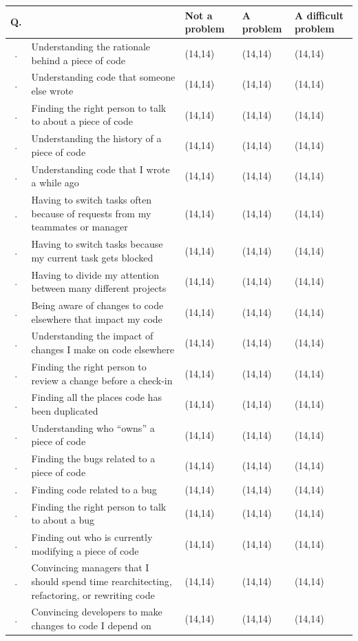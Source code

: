 \documentclass[12pt, letterpaper]{article}
\newcommand{\incrcounter}[1]{\addtocounter{#1}{1}}
\newcounter{questionnum}
\newcounter{subquestionnum}
\newcommand{\likertthree}[1]{
    \hfill \relax\thequestionnum.\thesubquestionnum\hfill\hfill &\textsf{#1} &{ \framebox(14,14){} } & { \framebox(14,14){}} & { \framebox(14,14){}} \incrcounter{subquestionnum}\\ \hline
}
\newcommand{\divider}{\hline}
\begin{document}
	{
		\begin{longtable}{|c| p{6cm} | p{2.5 cm} p{2.5 cm} p{2.5 cm}  |}
			\divider
			Q.  &  & Not a problem & A problem & A difficult problem\\
			\divider\divider
			
			\likertthree{Understanding the rationale behind a piece of code}
			\likertthree{Understanding code that someone else wrote}
			\likertthree{Finding the right person to talk to about a piece of code}
			\likertthree{Understanding the history of a piece of code}
			\likertthree{Understanding code that I wrote a while ago}
			\likertthree{Having to switch tasks often because of requests from my teammates or manager}
			\likertthree{Having to switch tasks because my current task gets blocked}
			\likertthree{Having to divide my attention between many different projects}
			\likertthree{Being aware of changes to code elsewhere that impact my code}
			\likertthree{Understanding the impact of changes I make on code elsewhere}
			\likertthree{Finding the right person to review a change before a check-in}
			\likertthree{Finding all the places code has been duplicated}
			\likertthree{Understanding who ``owns'' a piece of code}
			\likertthree{Finding the bugs related to a piece of code}
			\likertthree{Finding code related to a bug}
			\likertthree{Finding the right person to talk to about a bug}
			\likertthree{Finding out who is currently modifying a piece of code}
			\likertthree{Convincing managers that I should spend time rearchitecting, refactoring, or rewriting code}
			\likertthree{Convincing developers to make changes to code I depend on}
		\end{longtable}
	} \incrcounter{questionnum}
	
\end{document}
